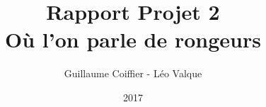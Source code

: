 \documentclass{article}
\title{ \Huge{Rapport Projet 2} \\ Où l'on parle de rongeurs}
\author{Guillaume Coiffier - Léo Valque}
\date{2017}
\begin{document}
\renewcommand{\labelitemi}{$\bullet$}

\maketitle
\tableofcontents
\newpage


\newpage


\nocite{*}


\listoffigures
\end{document}
